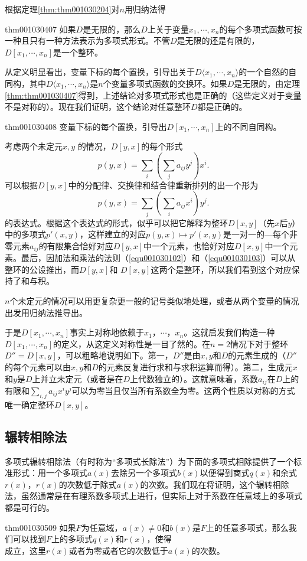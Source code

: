 根据定理\ref{thm:thm001030204}对$n$用归纳法得
\begin{theorem}{}{thm001030407}
如果$D$是无限的，那么$D$上关于变量$x_1,\cdots, x_n$的每个多项式函数可按一种且只有一种方法表示为多项式形式。不管$D$是无限的还是有限的，$D[x_1,\cdots,x_n]$是一个整环。
\end{theorem}

从定义明显看出，变量下标的每个置换，引导出关于$D\langle{x_1,\cdots,x_n}\rangle$的一个自然的自同构，其中$D\langle{x_1,\cdots, x_n}\rangle$是$n$个变量多项式函数的交换环。如果$D$是无限的，由定理\ref{thm:thm001030407}得到，上述结论对多项式形式也是正确的（这些定义对于变量不是对称的）。现在我们证明，这个结论对任意整环$D$都是正确的。
\begin{theorem}{}{thm001030408}
变量下标的每个置换，引导出$D[x_1,\cdots,x_n]$上的不同自同构。
\end{theorem}

考虑两个未定元$x, y$
的情况，$D[y, x]$的每个形式
\[
p(y, x) = \sum_{i}{(\sum_{j}{a_{ij}y^j})x^i}.
\]
可以根据$D[y,x]$中的分配律、交换律和结合律重新排列的出一个形为
\[
p(y, x) = \sum_{j}{(\sum_{i}{a_{ij}x^i})y^j}.
\]
的表达式。根据这个表达式的形式，似乎可以把它解释为整环$D[x, y]$（先$x$后$y$）中的多项式$p'(x, y)$，这样建立的对应$p(y, x) \mapsto p'(x, y)$是一对一的---每个非零元素$a_{ij}$的有限集合恰好对应$D[y, x]$中一个元素，也恰好对应$D[x, y]$中一个元素。最后，因加法和乘法的法则（\ref{equ001030102}）和（\ref{equ001030103}）可以从整环的公设推出，而$D[y, x]$和 $D[x, y]$这两个是整环，所以我们看到这个对应保持了和与积。

$n$个未定元的情况可以用更复杂更一般的记号类似地处理，或者从两个变量的情况出发用归纳法推导出。

于是$D[x_1, \cdots, x_n]$事实上对称地依赖于$x_1$，$\cdots$，$x_n$。这就启发我们构造一种$D[x_1, \cdots, x_n]$的定义，从这定义对称性是一目了然的。在$n=2$情况下对于整环$D''=D[x,y]$，可以粗略地说明如下。第一，$D''$是由$x, y$和$D$的元素生成的（$D''$的每个元素可以由$x, y$和$D$的元素反复进行求和与求积运算而得）。第二，生成元$x$和$y$是$D$上并立未定元（或者是在$D$上代数独立的）。这就意味着，系数$a_{ij}$在$D$上的有限和$\sum_{i,j}{a_{ij}x^iy^j}$可以为零当且仅当所有系数全为零。这两个性质以对称的方式唯一确定整环$D[x, y]$。


\subsection{辗转相除法}\label{subsection0010305}
多项式辗转相除法（有时称为“多项式长除法”）为下面的多项式相除提供了一个标准形式：用一个多项式$a(x)$去除另一个多项式$b(x)$以便得到商式$q(x)$和余式$r(x)$，$r(x)$的次数低于除式$a(x)$的次数。我们现在将证明，这个辗转相除法，虽然通常是在有理系数多项式上进行，但实际上对于系数在任意域上的多项式都是可行的。
\begin{theorem}{}{thm001030509}
如果$F$为任意域，$a(x) \neq 0$和$b(x)$是$F$上的任意多项式，那么我们可以找到$F$上的多项式$q(x)$和$r(x)$，使得
\begin{equation}\label{equ001030508}
\end{equation}
成立，这里$r(x)$或者为零或者它的次数低于$a(x)$的次数。
\end{theorem}

